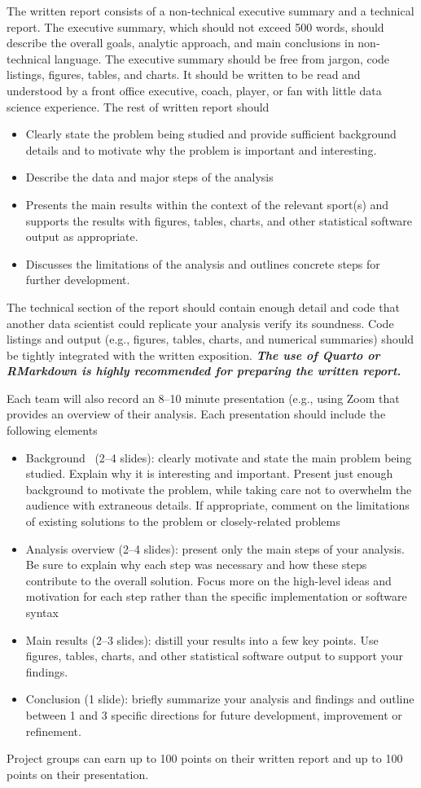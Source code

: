 \documentclass[11pt]{article}
\begin{document}
The written report consists of a non-technical executive summary and a technical report.
The executive summary, which should not exceed 500 words, should describe the overall goals, analytic approach, and main conclusions in non-technical language.
The executive summary should be free from jargon, code listings, figures, tables, and charts.
It should be written to be read and understood by a front office executive, coach, player, or fan with little data science experience.
The rest of written report should 
\begin{itemize}
\item{Clearly state the problem being studied and provide sufficient background details and to motivate why the problem is important and interesting.}
\item{Describe the data and major steps of the analysis}
\item{Presents the main results within the context of the relevant sport(s) and supports the results with figures, tables, charts, and other statistical software output as appropriate.}
\item{Discusses the limitations of the analysis and outlines concrete steps for further development.}
\end{itemize}
The technical section of the report should contain enough detail and code that another data scientist could replicate your analysis verify its soundness.
Code listings and output (e.g., figures, tables, charts, and numerical summaries) should be tightly integrated with the written exposition.
\emph{\textbf{The use of Quarto or RMarkdown is highly recommended for preparing the written report.}}

Each team will also record an 8--10 minute presentation (e.g., using Zoom that provides an overview of their analysis.
Each presentation should include the following elements
\begin{itemize}
\item{Background  (2--4 slides): clearly motivate and state the main problem being studied. Explain why it is interesting and important. Present just enough background to motivate the problem, while taking care not to overwhelm the audience with extraneous details. If appropriate, comment on the limitations of existing solutions to the problem or closely-related problems}
\item{Analysis overview (2--4 slides): present only the main steps of your analysis. Be sure to explain why each step was necessary and how these steps contribute to the overall solution. Focus more on the high-level ideas and motivation for each step rather than the specific implementation or software syntax}
\item{Main results (2--3 slides): distill your results into a few key points. Use figures, tables, charts, and other statistical software output to support your findings.}
\item{Conclusion (1 slide): briefly summarize your analysis and findings and outline between 1 and 3 specific directions for future development, improvement or refinement.}
\end{itemize}
Project groups can earn up to 100 points on their written report and up to 100 points on their presentation.
\end{document}
